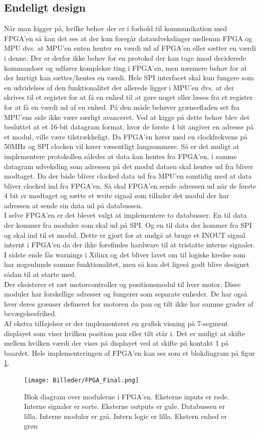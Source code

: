 \subsection{Endeligt design}
Når man kigger på, hvilke behov der er i forhold til kommunikation med FPGA'en så kan det ses at der kun foregår dataudvekslinger mellemm FPGA og MPU dvs. at MPU'en enten henter en værdi ud af FPGA'en eller sætter en værdi i denne. Der er derfor ikke behov for en protokol der kan tage imod deciderede kommandoer og udfører komplekse ting i FPGA'en, men nærmere behov for at der hurtigt kan sættes/hentes en værdi. Hele SPI interfacet skal kun fungere som en udvidelses af den funktionalitet der allerede ligger i MPU'en dvs. at der skrives til et register for at få en enhed til at gøre noget eller læses fra et register for at få en værdi ud af en enhed. På den måde behøver grænsefladen set fra MPU'ens side ikke være særligt avanceret. Ved at kigge på dette behov blev det besluttet at et 16-bit datagram format, hvor de første 4 bit angiver en adresse på et modul, ville være tilstrækkeligt. Da FPGA'en kører med en clockfrekvens på 50MHz og SPI clocken vil kører væsentligt langsommere. Så er det muligt at implementere protokollen således at data kan hentes fra FPGA'en, i samme datagram udveksling som adressen på det modul dataen skal hentes ud fra bliver modtaget. Da der både bliver clocked data ud fra MPU'en samtidig med at data bliver clocked ind fra FPGA'en. Så skal FPGA'en sende adressen ud når de første 4 bit er modtaget og sætte et write signal som tillader det modul der har adressen at sende sin data ud på databussen.\\
I selve FPGA'en er det blevet valgt at implementere to databusser. En til data der kommer fra moduler som skal ud på SPI. Og en til data der kommer fra SPI og skal ind til et modul. Dette er gjort for at undgå at bruge et INOUT signal internt i FPGA'en da der ikke forefindes hardware til at tristatte interne signaler. I sidste ende fås warnings i Xilinx og det bliver lavet om til logiske kredse som har nogenlunde samme funktionalitet, men så kan det ligeså godt blive designet sådan til at starte med.\\
Der eksisterer et sæt motorcontroller og positionsmodul til hver motor. Disse moduler har forskellige adresser og fungerer som separate enheder. De har også hver deres grænser defineret for motoren da pan og tilt ikke har samme grader af bevægelsesfrihed.\\
Af ekstra tilføjelser er der implementeret en grafisk visning på 7-segment displayet som viser hvilken position pan eller tilt står i. Det er muligt at skifte mellem hvilken værdi der vises på displayet ved at skifte på kontakt 1 på boardet. Hele implementeringen af FPGA'en kan ses som et blokdiagram på figur \ref{fig:FPGA_Final}.

\begin{figure}[ht]
	\begin{center}
		\texttt{[image: Billeder/FPGA\_Final.png]}
	\end{center}
\caption{Blok diagram over modulerne i FPGA'en. Eksterne inputs er røde. Interne signaler er sorte. Eksterne outputs er gule. Databussen er lilla. Interne moduler er grå. Intern logic er lilla. Ekstern enhed er grøn}
\label{fig:FPGA_Final}
\end{figure}